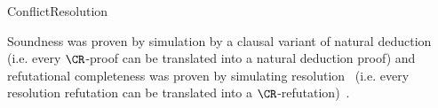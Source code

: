 \begin{entry}{ConflictResolution}
\begin{technicalities}
Soundness was proven by simulation by a clausal variant of natural
deduction~ (i.e. every $\CR$-proof can be translated into a
natural deduction proof) and refutational completeness was proven by simulating
resolution~ (i.e. every resolution refutation can be translated
into a $\CR$-refutation)~\cite{ConflictResolution}.  
\end{technicalities}


\end{entry}

